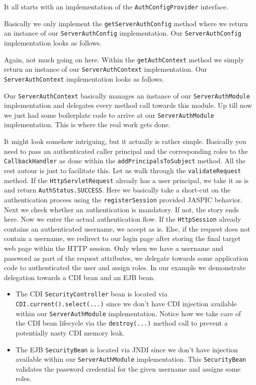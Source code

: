 It all starts with an implementation of the \texttt{AuthConfigProvider} interface.

Basically we only implement the \texttt{getServerAuthConfig} method where we return an instance of our \texttt{ServerAuthConfig} implementation.
Our  \texttt{ServerAuthConfig} implementation looks as follows.

Again, not much going on here.
Within the \texttt{getAuthContext} method we simply return an instance of our \texttt{ServerAuthContext} implementation.
Our \texttt{ServerAuthContext} implementation looks as follows.

Our \texttt{ServerAuthContext} basically manages an instance of our \texttt{ServerAuthModule} implementation and delegates every method call towards this module.
Up till now we just had some boilerplate code to arrive at our \texttt{ServerAuthModule} implementation.
This is where the real work gets done.

It might look somehow intriguing, but it actually is rather simple.
Basically you need to pass an authenticated caller principal and the corresponding roles to the \texttt{CallbackHandler} as done within the \texttt{addPrincipalsToSubject} method.
All the rest autour is just to facilitate this.
Let us walk through the \texttt{validateRequest} method.
If the \texttt{HttpServletRequest} already has a user principal, we take it as is and return \texttt{AuthStatus.SUCCESS}.
Here we basically take a short-cut on the authentication process using the 
\texttt{registerSession} provided JASPIC behavior.
Next we check whether an authentication is mandatory.
If not, the story ends here.
Now we enter the actual authentication flow.
If the \texttt{HttpSession} already contains an authenticated username, we accept as is.
Else, if the request does not contain a username, we redirect to our login page after storing the final target web page within the HTTP session.
Only when we have a username and password as part of the request attributes,
we delegate towards some application code to authenticated the user and assign roles.
In our example we demonstrate delegation towards a CDI bean and an EJB bean.
\begin{itemize}
	\item The CDI \texttt{SecurityController} bean is located via \texttt{CDI.current().select(...)} since we don't have CDI injection available within our \texttt{ServerAuthModule} implementation.
	Notice how we take care of the CDI bean lifecycle via the \texttt{destroy(...)} method call to prevent a potentially nasty CDI memory leak.
	\item
The EJB \texttt{SecurityBean} is located via JNDI since we don't have injection available within our \texttt{ServerAuthModule} implementation.
This \texttt{SecurityBean} validates the password credential for the given username and assigns some roles.
\end{itemize}
